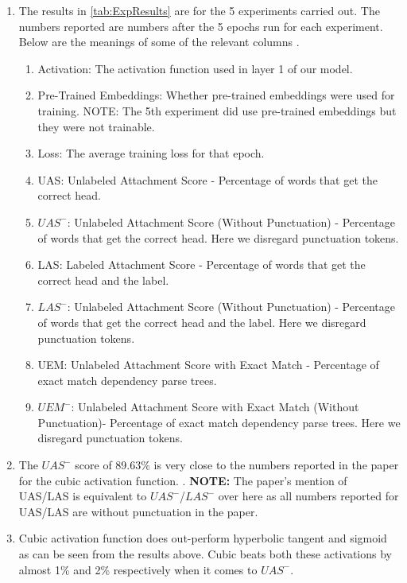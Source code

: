 \documentclass[11pt]{article}
\begin{document}
\begin{enumerate}
	
	\item The results in \ref{tab:ExpResults} are for the 5 experiments carried out. The numbers reported are numbers after the 5 epochs run for each experiment. Below are the meanings of some of the relevant columns \cite{Evaluations1} \cite{Evaluations2}.
	
	\begin{enumerate}
		\item Activation: The activation function used in layer 1 of our model.
		\item Pre-Trained Embeddings: Whether pre-trained embeddings were used for training. NOTE: The 5th experiment did use pre-trained embeddings but they were not trainable.
		\item Loss: The average training loss for that epoch.
		\item UAS: Unlabeled Attachment Score - Percentage of words that get the correct head.
		\item $UAS^-$: Unlabeled Attachment Score (Without Punctuation) - Percentage of words that get the correct head. Here we disregard punctuation tokens.
		\item LAS: Labeled Attachment Score - Percentage of words that get the correct head and the label.
		\item $LAS^-$: Unlabeled Attachment Score (Without Punctuation) - Percentage of words that get the correct head and the label. Here we disregard punctuation tokens.
		\item UEM: Unlabeled Attachment Score with Exact Match - Percentage of exact match dependency parse trees.
		\item $UEM^-$: Unlabeled Attachment Score with Exact Match (Without Punctuation)- Percentage of exact match dependency parse trees. Here we disregard punctuation tokens.
	\end{enumerate}

	\item The $ UAS^- $ score of 89.63\% is very close to the numbers reported in the paper for the cubic activation function. \cite{DependencyParserNeuralNetwork}. \textbf{NOTE:} The paper's mention of UAS/LAS is equivalent to $UAS^-$/$LAS^-$ over here as all numbers reported for UAS/LAS are without punctuation in the paper.
	
	\item Cubic activation function does out-perform hyperbolic tangent and sigmoid as can be seen from the results above. Cubic beats both these activations by almost 1\% and 2\% respectively when it comes to $UAS^-$.
	

\end{enumerate}
\end{document}
